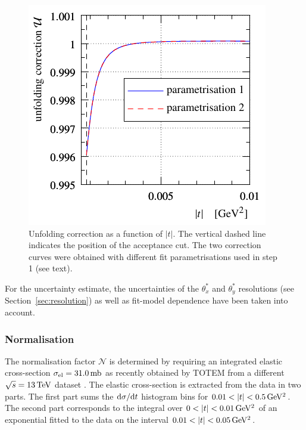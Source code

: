 \begin{figure}
\begin{center}
\includegraphics{fig/unfolding_num_int_model_cmp.pdf}
\caption{%
Unfolding correction as a function of $|t|$. The vertical dashed line indicates the position of the acceptance cut. The two correction curves were obtained with different fit parametrisations used in step 1 (see text).
}
\label{fig:unfolding}
\end{center}
\end{figure}

For the uncertainty estimate, the uncertainties of the $\theta_x^*$ and $\theta_y^*$ resolutions (see Section~\ref{sec:resolution}) as well as fit-model dependence have been taken into account.




\subsubsection{Normalisation}
\label{sec:normalisation}

The normalisation factor $\mathcal{N}$ is determined by requiring an integrated elastic cross-section $\sigma_{\rm el} = 31.0\,{\rm mb}$ as recently obtained by TOTEM from a different $\sqrt s = 13\,{\rm TeV}$ dataset \cite{totem-13tev-90m}. The elastic cross-section is extracted from the data in two parts. The first part sums the ${\rm d}\sigma/{\rm d} t$ histogram bins for $0.01 < |t| < 0.5\,{\rm GeV^2}$. The second part corresponds to the integral over $0 < |t| < 0.01\,{\rm GeV^2}$ of an exponential fitted to the data on the interval $0.01 < |t| < 0.05\,{\rm GeV^2}$.

